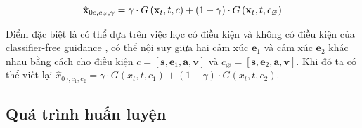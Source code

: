 \begin{equation} \label{eq:denoise}
\hat{\mathbf{x}}_{0 c, c_{\varnothing}, \gamma}=\gamma \cdot G \left(\mathbf{x}_{t}, t, c\right)+(1-\gamma) \cdot G \left(\mathbf{x}_{t}, t, c_{\varnothing}\right)
\end{equation}

Điểm đặc biệt là có thể dựa trên việc học có điều kiện và không có điều kiện của classifier-free guidance \cite{ho2022classifier}, có thể nội suy giữa hai cảm xúc $\mathbf{e}_1$ và cảm xúc $\mathbf{e}_2$ khác nhau bằng cách cho điều kiện $c = \left[\mathbf{s}, \mathbf{e}_{1}, \mathbf{a}, \mathbf{v} \right]$ và $c_\varnothing = \left[\mathbf{s}, \mathbf{e}_{2}, \mathbf{a}, \mathbf{v} \right]$. Khi đó ta có thể viết lại $\hat{x}_{0 \gamma, c_{1}, c_{2}}=\gamma  \cdot G \left(x_{t}, t, c_{1} \right)+(1-\gamma) \cdot G \left(x_{t}, t, c_{2}\right)$.


\subsection{Quá trình huấn luyện}



